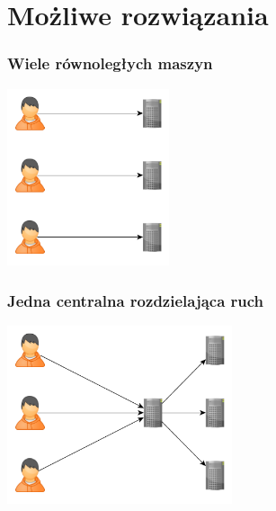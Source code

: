 \documentclass[12pt]{beamer}
\begin{document}
\section{Możliwe rozwiązania}
\begin{frame}
\frametitle{Wiele równoległych maszyn}
\begin{center}
\includegraphics[width=180px]{img/klaster1.png}
\end{center}
\end{frame}
\begin{frame}
\frametitle{Jedna centralna rozdzielająca ruch}
\begin{center}
\includegraphics[width=250px]{img/klaster2.png}
\end{center}
\end{frame}
\end{document}
